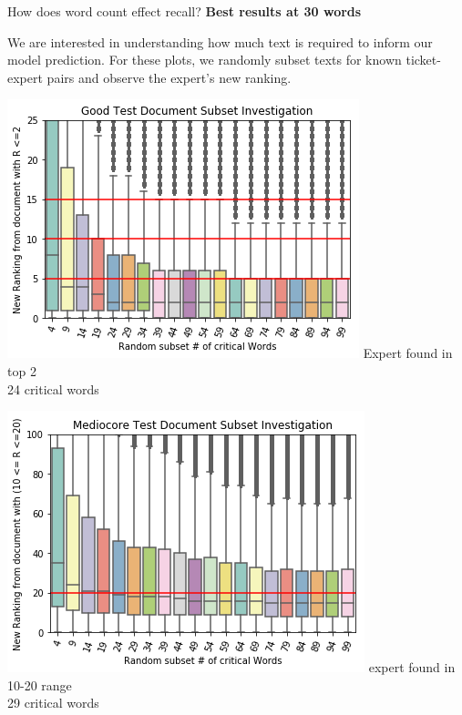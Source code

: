 \documentclass[10pt]{beamer}
\begin{document}
\begin{frame}{How does word count effect recall?}
  {\bf Best results at 30 words}

  We are interested in understanding how much text is required to inform
  our model prediction. For these plots, we randomly subset texts for
  known ticket-expert pairs and observe the expert's new ranking.

  \begin{multicols}{2}
    \includegraphics[width=\columnwidth]{low-ranked-downsample.png}
    Expert found in top 2\\
    24 critical words


    \includegraphics[width=\columnwidth]{mid-ranked-downsample.png}
    expert found in 10-20 range\\
    29 critical words
  \end{multicols}
\end{frame}
\end{document}
